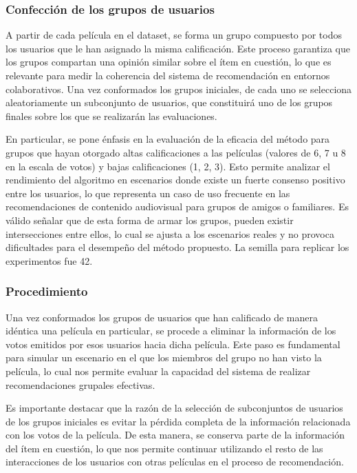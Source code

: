 \documentclass[twocolumn, fontsize=10pt]{article}
\begin{document}
 \subsubsection{Confección de los grupos de usuarios}
 A partir de cada película en el dataset, se forma un grupo compuesto por todos los usuarios que le han asignado la misma calificación. Este proceso garantiza que los grupos compartan una opinión similar sobre el ítem en cuestión, lo que es relevante para medir la coherencia del sistema de recomendación en entornos colaborativos. Una vez conformados los grupos iniciales, de cada uno se selecciona aleatoriamente un subconjunto de usuarios, que constituirá uno de los grupos finales sobre los que se realizarán las evaluaciones.

En particular, se pone énfasis en la evaluación de la eficacia del método para grupos que hayan otorgado altas calificaciones a las películas (valores de 6, 7 u 8 en la escala de votos) y bajas calificaciones (1, 2, 3). Esto permite analizar el rendimiento del algoritmo en escenarios donde existe un fuerte consenso positivo entre los usuarios, lo que representa un caso de uso frecuente en las recomendaciones de contenido audiovisual para grupos de amigos o familiares.
Es válido señalar que de esta forma de armar los grupos, pueden existir intersecciones entre ellos, lo cual se ajusta a los escenarios reales y no provoca dificultades para el desempeño del método propuesto. La semilla para replicar los experimentos fue 42.
 
\subsubsection{Procedimiento}

Una vez conformados los grupos de usuarios que han calificado de manera idéntica una película en particular, se procede a eliminar la información de los votos emitidos por esos usuarios hacia dicha película. Este paso es fundamental para simular un escenario en el que los miembros del grupo no han visto la película, lo cual nos permite evaluar la capacidad del sistema de realizar recomendaciones grupales efectivas.

Es importante destacar que la razón de la selección de subconjuntos de usuarios de los grupos iniciales es evitar la pérdida completa de la información relacionada con los votos de la película. De esta manera, se conserva parte de la información del ítem en cuestión, lo que nos permite continuar utilizando el resto de las interacciones de los usuarios con otras películas en el proceso de recomendación.
\end{document}
